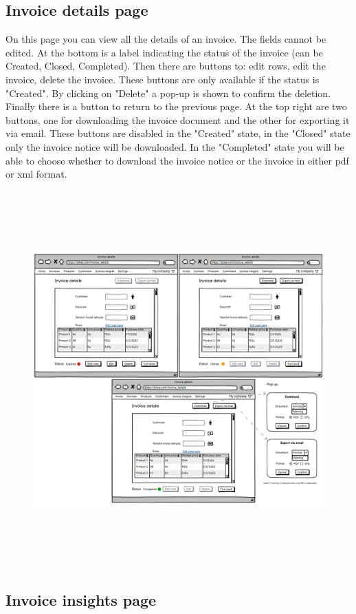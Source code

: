 \subsection{Invoice details page}
On this page you can view all the details of an invoice. The fields cannot be edited. At the bottom is a label indicating the status of the invoice (can be Created, Closed, Completed). Then there are buttons to: edit rows, edit the invoice, delete the invoice. These buttons are only available if the status is "Created". By clicking on "Delete" a pop-up is shown to confirm the deletion. Finally there is a button to return to the previous page.
At the top right are two buttons, one for downloading the invoice document and the other for exporting it via email. These buttons are disabled in the "Created" state, in the "Closed" state only the invoice notice will be downloaded. In the "Completed" state you will be able to choose whether to download the invoice notice or the invoice in either pdf or xml format.
\begin{figure}[h!]
    \centering
    \includegraphics[height=410pt, keepaspectratio]{resources/mockup/Invoice_details.png}
\end{figure}
\newpage

\subsection{Invoice insights page}

